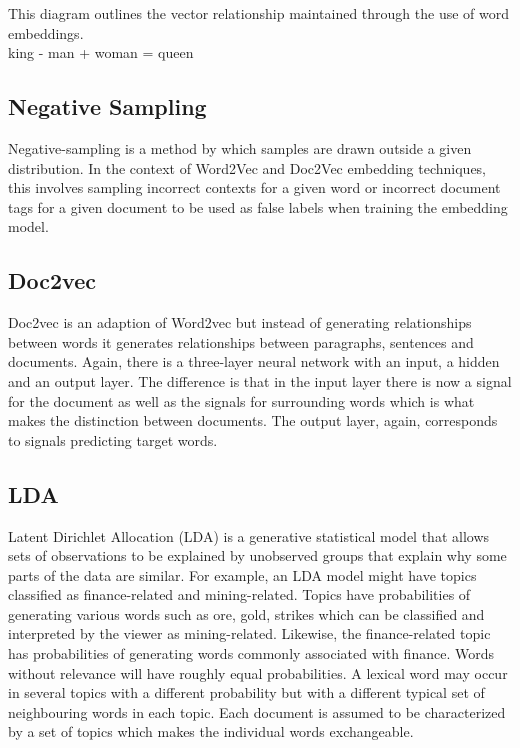 \documentclass[11pt]{article}
\begin{document}
This diagram outlines the vector relationship maintained through the use
of word embeddings.\\
king - man + woman = queen

\hypertarget{negative-sampling}{%
\subsection{Negative Sampling}\label{negative-sampling}}

Negative-sampling is a method by which samples are drawn outside a given
distribution. In the context of Word2Vec and Doc2Vec embedding
techniques, this involves sampling incorrect contexts for a given word
or incorrect document tags for a given document to be used as false
labels when training the embedding model.

\hypertarget{doc2vec}{%
\subsection{Doc2vec}\label{doc2vec}}

Doc2vec is an adaption of Word2vec but instead of generating
relationships between words it generates relationships between
paragraphs, sentences and documents. Again, there is a three-layer
neural network with an input, a hidden and an output layer. The
difference is that in the input layer there is now a signal for the
document as well as the signals for surrounding words which is what
makes the distinction between documents. The output layer, again,
corresponds to signals predicting target words.

\hypertarget{lda}{%
\subsection{LDA}\label{lda}}

Latent Dirichlet Allocation (LDA) is a generative statistical model that
allows sets of observations to be explained by unobserved groups that
explain why some parts of the data are similar. For example, an LDA
model might have topics classified as finance-related and
mining-related. Topics have probabilities of generating various words
such as ore, gold, strikes which can be classified and interpreted by
the viewer as mining-related. Likewise, the finance-related topic has
probabilities of generating words commonly associated with finance.
Words without relevance will have roughly equal probabilities. A lexical
word may occur in several topics with a different probability but with a
different typical set of neighbouring words in each topic. Each document
is assumed to be characterized by a set of topics which makes the
individual words exchangeable.
\end{document}
